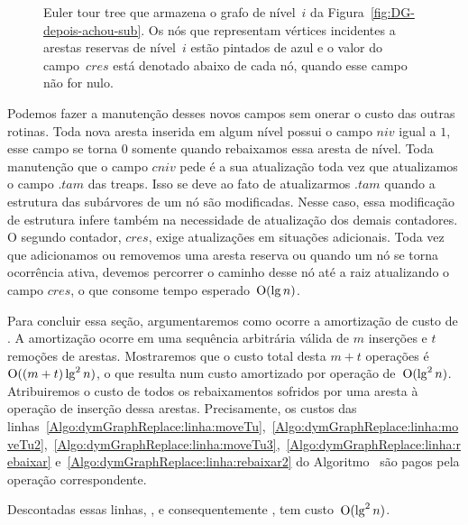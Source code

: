 \begin{figure}[htb]
\scalebox{.61}{
\centering
}
\caption{Euler tour tree que armazena o grafo de nível~$i$ da Figura~\ref{fig:DG-depois-achou-sub}. Os nós que representam vértices incidentes a arestas reservas de nível~$i$ estão pintados de azul e o valor do campo~$cres$ está denotado abaixo de cada nó, quando esse campo não for nulo.}
\label{fig:DG-TREAP-res}
\end{figure}

Podemos fazer a manutenção desses novos campos sem onerar o custo das outras rotinas. Toda nova aresta inserida em algum nível possui o campo $niv$ igual a $1$, esse campo se torna $0$ somente quando rebaixamos essa aresta de nível. Toda manutenção que o campo $cniv$ pede é a sua atualização toda vez que atualizamos o campo $.tam$ das treaps. Isso se deve ao fato de atualizarmos $.tam$ quando a estrutura das subárvores de um nó são modificadas. Nesse caso, essa modificação de estrutura infere também na necessidade de atualização dos demais contadores. O segundo contador, $cres$, exige atualizações em situações adicionais. Toda vez que adicionamos ou removemos uma aresta reserva ou quando um nó se torna ocorrência ativa, devemos percorrer o caminho desse nó até a raiz atualizando o campo $cres$, o que consome tempo esperado~$\mathrm{O}(\lg n)$.


Para concluir essa seção, argumentaremos como ocorre a amortização de custo de \dymGraphDelEdge{}. 
A amortização ocorre em uma sequência arbitrária válida de $m$ inserções e $t$ remoções de arestas.
Mostraremos que o custo total desta $m+t$ operações é~$\mathrm{O}((m+t)\lg^2 n)$,
o que resulta num custo amortizado por operação de~$\mathrm{O}(\lg^2 n)$.
Atribuiremos o custo de todos os rebaixamentos sofridos por uma aresta à operação de inserção dessa arestas.
Precisamente, os custos das linhas~\ref{Algo:dymGraphReplace:linha:moveTu},~\ref{Algo:dymGraphReplace:linha:moveTu2},~\ref{Algo:dymGraphReplace:linha:moveTu3},~\ref{Algo:dymGraphReplace:linha:rebaixar} e~\ref{Algo:dymGraphReplace:linha:rebaixar2} do Algoritmo~\dymGraphReplace{} são pagos pela operação \dymGraphAddEdge{} correspondente.

Descontadas essas linhas, \dymGraphReplace{}, e consequentemente \dymGraphDelEdge{}, tem custo~$\mathrm{O}(\lg^2 n)$.

